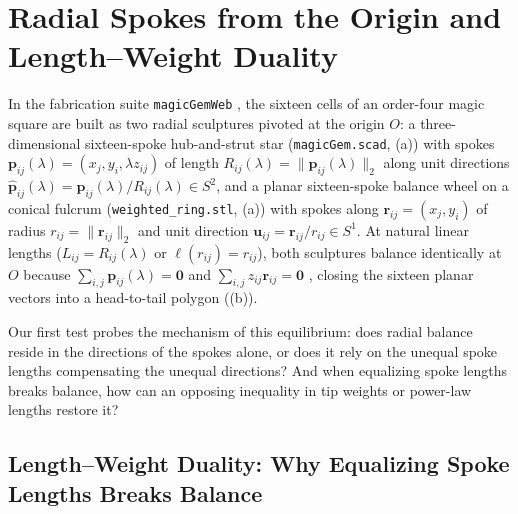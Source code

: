 \section{Radial Spokes from the Origin and Length--Weight Duality}
\label{sec:vectors}

In the fabrication suite \texttt{magicGemWeb} \citep{mathewson2025magicgemweb}, the sixteen cells of an order-four magic square are built as two radial sculptures pivoted at the origin $O$: a three-dimensional sixteen-spoke hub-and-strut star (\texttt{magicGem.scad}, (a)) with spokes $\mathbf p_{ij}(\lambda)=(x_j,y_i,\lambda z_{ij})$ of length $R_{ij}(\lambda)=\|\mathbf p_{ij}(\lambda)\|_2$ along unit directions $\hat{\mathbf p}_{ij}(\lambda)=\mathbf p_{ij}(\lambda)/R_{ij}(\lambda)\in S^2$, and a planar sixteen-spoke balance wheel on a conical fulcrum (\texttt{weighted\_ring.stl}, (a)) with spokes along $\mathbf r_{ij}=(x_j,y_i)$ of radius $r_{ij}=\|\mathbf r_{ij}\|_2$ and unit direction $\mathbf u_{ij}=\mathbf r_{ij}/r_{ij}\in S^1$. At natural linear lengths ($L_{ij}=R_{ij}(\lambda)$ or $\ell(r_{ij})=r_{ij}$), both sculptures balance identically at $O$ because $\sum_{i,j}\mathbf p_{ij}(\lambda)=\mathbf 0$ and $\sum_{i,j}z_{ij}\mathbf r_{ij}=\mathbf 0$ \citep{loly2004invariance,rogers2005multipole}, closing the sixteen planar vectors into a head-to-tail polygon ((b)).

Our first test probes the mechanism of this equilibrium: does radial balance reside in the directions of the spokes alone, or does it rely on the unequal spoke lengths compensating the unequal directions? And when equalizing spoke lengths breaks balance, how can an opposing inequality in tip weights or power-law lengths restore it?

\subsection{Length--Weight Duality: Why Equalizing Spoke Lengths Breaks Balance}


